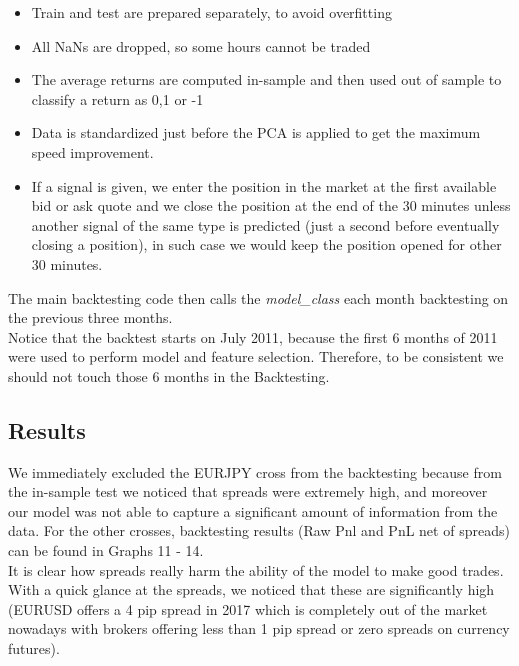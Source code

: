 \documentclass[a4paper]{article}
\begin{document}
\begin{itemize}
	\item Train and test are prepared separately, to avoid overfitting 
	\item All NaNs are dropped, so some hours cannot be traded
	\item The average returns are computed in-sample and then used out of sample to classify a return as 0,1 or -1
	\item Data is standardized just before the PCA is applied to get the maximum speed improvement.
	\item If a signal is given, we enter the position in the market at the first available bid or ask quote and we close the position at the end of the 30 minutes unless another signal of the same type is predicted (just a second before eventually closing a position), in such case we would keep the position opened for other 30 minutes.
\end{itemize}

The main backtesting code then calls the \textit{model\_class} each month backtesting on the previous three months.\\ Notice that the backtest starts on July 2011, because the first 6 months of 2011 were used to perform model and feature selection. Therefore, to be consistent we should not touch those 6 months in the Backtesting.\\

\subsection{Results}

We immediately excluded the EURJPY cross from the backtesting because from the in-sample test we noticed that spreads were extremely high, and moreover our model was not able to capture a significant amount of information from the data. For the other crosses, backtesting results (Raw Pnl and PnL net of spreads) can be found in Graphs 11 - 14.\\
It is clear how spreads really harm the ability of the model to make good trades. With a quick glance at the spreads, we noticed that these are significantly high (EURUSD offers a 4 pip spread in 2017 which is completely out of the market nowadays with brokers offering less than 1 pip spread or zero spreads on currency futures).\\
\end{document}
